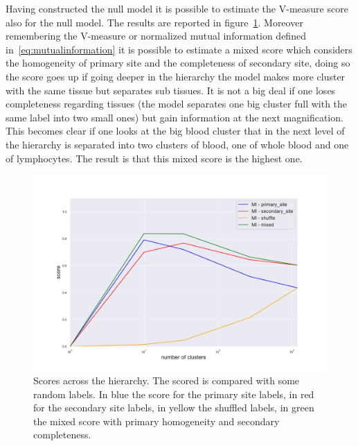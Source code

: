Having constructed the null model it is possible to estimate the V-measure score also for the null model. The results are reported in figure~\ref{fig:topic/gtex/oversigma_10tissue/metric_scores_shuffle}. 
Moreover remembering the V-measure or normalized mutual information defined in~\ref{eq:mutualinformation} it is possible to estimate a mixed score which considers the homogeneity of primary site and the completeness of secondary site, doing so the score goes up if going deeper in the hierarchy the model makes more cluster with the same tissue but separates sub tissues. It is not a big deal if one loses completeness regarding tissues (the model separates one big cluster full with the same label into two small ones) but gain information at the next magnification. This becomes clear if one looks at the big blood cluster that in the next level of the hierarchy is separated into two clusters of blood, one of whole blood and one of lymphocytes. The result is that this mixed score is the highest one.
\begin{figure}[htb!]
    \centering
    \includegraphics[width=0.9\linewidth]{pictures/topic/gtex/oversigma_10tissue/metric_scores_shuffle.pdf}
    \caption{Scores across the hierarchy. The scored is compared with some random labels. In blue the score for the primary site labels, in red for the secondary site labels, in yellow the shuffled labels, in green the mixed score with primary homogeneity and secondary completeness.}
    \label{fig:topic/gtex/oversigma_10tissue/metric_scores_shuffle}
\end{figure}
\FloatBarrier

